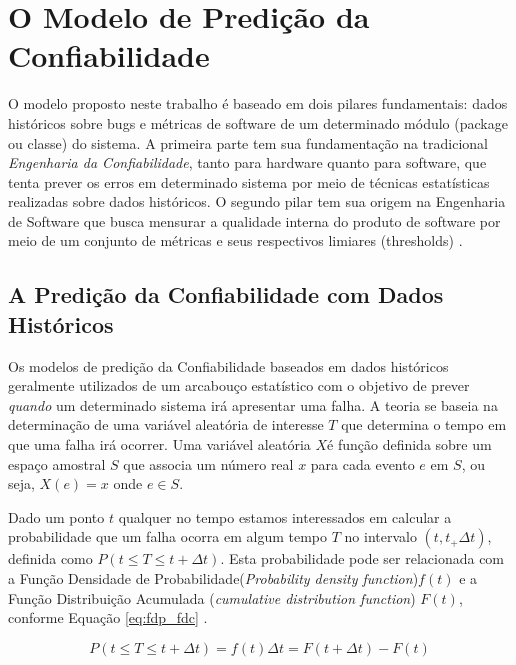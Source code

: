 \documentclass[12pt]{article}
\begin{document}
\section{O Modelo de Predição da Confiabilidade}
\label{sec:modelo}

O modelo proposto neste trabalho é baseado em dois pilares fundamentais: dados
históricos sobre bugs e métricas de software de um determinado módulo (package
ou classe) do sistema. A primeira parte tem sua fundamentação na
tradicional \textit{Engenharia da Confiabilidade}, tanto para hardware quanto
para software, que tenta prever os erros em determinado sistema por meio de
técnicas estatísticas realizadas sobre dados históricos. O segundo pilar tem sua
origem na Engenharia de Software que busca mensurar a qualidade interna do produto de
software por meio de um conjunto de métricas e seus respectivos limiares
(thresholds)
\cite{oliveira2014extracting,ferreira2012identifying,alves2010deriving,abreu1994object}{}.

\subsection{A Predição da Confiabilidade com Dados Históricos}
\label{subsec:model_dados_historicos}

Os modelos de predição da Confiabilidade baseados em dados históricos geralmente
utilizados de um arcabouço estatístico com o objetivo de prever \textit{quando}
um determinado sistema irá apresentar uma falha. A teoria se baseia na
determinação de uma variável aleatória de interesse $T$ que determina o tempo em
que uma falha irá ocorrer. Uma variável aleatória $X $é função definida sobre um espaço
amostral $S$ que associa um número real $x$ para cada evento $e$ em $S$, ou
seja, $X(e) = x$ onde $e \in S${}.

Dado um ponto $t$ qualquer no tempo estamos interessados em calcular a
probabilidade que um falha ocorra em algum tempo $T$ no intervalo
$(t,t_+\Delta{}t)${}, definida como $P(t \le T \leq t + \Delta{}t)${}. Esta
probabilidade pode ser relacionada com a Função Densidade de
Probabilidade(\textit{Probability density function})$ f(t)$ e a Função
Distribuição Acumulada (\textit{cumulative distribution function}) $F(t)$,
conforme Equação \ref{eq:fdp_fdc} \cite{lyu1996handbook}{}.

\begin{equation} \label{eq:fdp_fdc}
    P(t \le T \leq t + \Delta{}t) = f(t)\Delta{}t = F(t + \Delta{}t) - F(t)
\end{equation}
\end{document}
